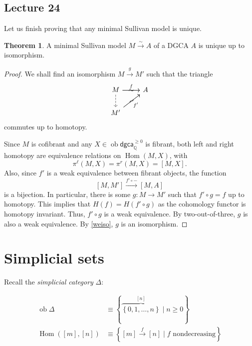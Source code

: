 \documentclass[10pt,letterpaper,cm]{nupset}
\theoremstyle{definition}
\theoremstyle{theorem}
\newtheorem{theorem}[defn]{Theorem}
\theoremstyle{remark}
\newcommand{\Q}{\mathbb Q}
\newcommand{\1}{\mathbb{1}}
\newcommand{\dgca}{\mathsf{dgca}}
\newcommand{\0}{\vec 0}
\DeclareMathOperator{\Hom}{Hom}
\DeclareMathOperator{\ob}{ob}
\begin{document}
\subsection{Lecture 24}

Let us finish proving that any minimal Sullivan model is unique.

\begin{theorem}
A minimal Sullivan model $M \xrightarrow{\sim} A$ of a DGCA $A$ is unique up to isomorphism.
\end{theorem}
\begin{proof}
We shall find an isomorphism $M \xrightarrow{g} M'$ such that the triangle
\[
\begin{tikzcd}
	M & A \\
	{M'}
	\arrow["{f'}"', from=2-1, to=1-2]
	\arrow["f", from=1-1, to=1-2]
	\arrow[dashed, from=1-1, to=2-1]
	\arrow["\sim"{marking}, from=1-1, to=1-2]
	\arrow["\sim"{marking}, from=2-1, to=1-2]
\end{tikzcd}
\] commutes up to homotopy. 

\medskip

Since $M$ is cofibrant and any $X \in \ob{\dgca_{\Q}^{\geq 0}}$ is fibrant, both left and right homotopy are equivalence relations on $\Hom(M,X)$, with
\[
\pi^{\ell}(M,X) = \pi^{r}(M,X) = \left[M, X\right]
.\] Also, since $f'$ is a weak equivalence between fibrant objects, the function
\[
\left[M, M'\right] \xrightarrow{f' \circ {-}} \left[M, A\right]
\] is a bijection. In particular, there is some $g : M \to M'$ such that $f' \circ g = f$ up to homotopy. This implies that $H(f) = H(f' \circ g)$ as the cohomology functor is homotopy invariant. Thus, $f' \circ g$ is a weak equivalence. By two-out-of-three, $g$ is also a weak equivalence. By \cref{weiso}, $g$ is an isomorphism. 
\end{proof}

\section{Simplicial sets}

Recall the \textit{simplicial category} $\Delta$:

\begin{align*}
\ob{\Delta} &  \equiv \left\{\overbrace{\left\{0,1, \ldots, n\right\}}^{\left[n\right]} \mid n \geq 0\right\} 
\\ \Hom(\left[m\right], \left[n\right]) &  \equiv \left\{\left[m\right] \xrightarrow{f} \left[n\right] \mid \text{$f$ nondecreasing} \right\}
\end{align*}
\end{document}
